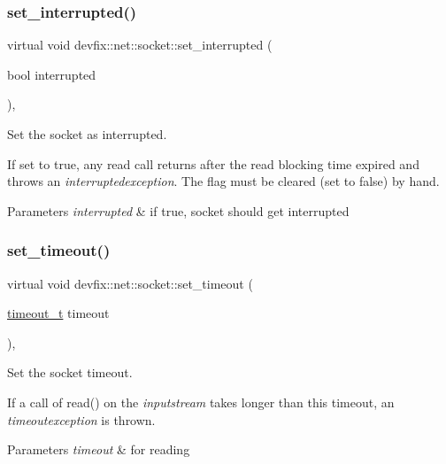 \subsubsection{\texorpdfstring{set\+\_\+interrupted()}{set\_interrupted()}}
{\footnotesize\ttfamily virtual void devfix\+::net\+::socket\+::set\+\_\+interrupted (\begin{DoxyParamCaption}\item[{bool}]{interrupted }\end{DoxyParamCaption})\hspace{0.3cm}{\ttfamily [pure virtual]}, {\ttfamily [noexcept]}}



Set the socket as interrupted. 

If set to true, any read call returns after the read blocking time expired and throws an {\itshape interruptedexception}. The flag must be cleared (set to false) by hand. 
\begin{DoxyParams}{Parameters}
{\em interrupted} & if true, socket should get interrupted \\
\hline
\end{DoxyParams}
\mbox{\label{structdevfix_1_1net_1_1socket_ae1cf3b2c4f5d39225d6585c387f967d5}} 
\subsubsection{\texorpdfstring{set\+\_\+timeout()}{set\_timeout()}}
{\footnotesize\ttfamily virtual void devfix\+::net\+::socket\+::set\+\_\+timeout (\begin{DoxyParamCaption}\item[{\hyperlink{structdevfix_1_1net_1_1socket_a80a3bf4cb7292bae31ea9c6575539c68}{timeout\+\_\+t}}]{timeout }\end{DoxyParamCaption})\hspace{0.3cm}{\ttfamily [pure virtual]}, {\ttfamily [noexcept]}}



Set the socket timeout. 

If a call of read() on the {\itshape inputstream} takes longer than this timeout, an {\itshape timeoutexception} is thrown. 
\begin{DoxyParams}{Parameters}
{\em timeout} & for reading \\
\hline
\end{DoxyParams}


